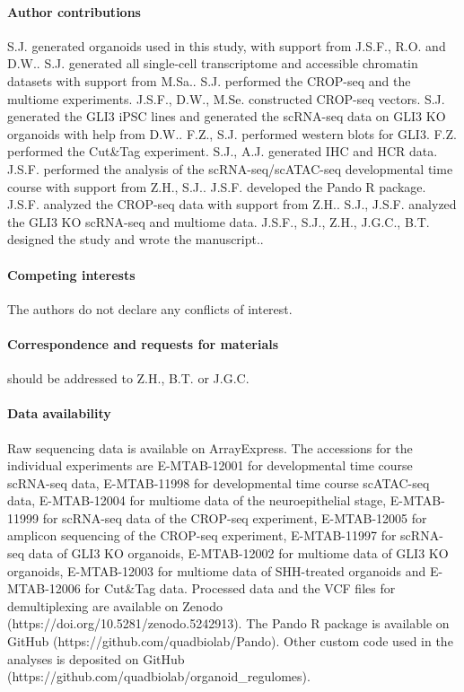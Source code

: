 \paragraph{Author contributions} S.J. generated organoids used in this study, with support from J.S.F., R.O. and D.W.. S.J. generated all single-cell transcriptome and accessible chromatin datasets with support from M.Sa.. S.J. performed the CROP-seq and the multiome experiments. J.S.F., D.W., M.Se. constructed CROP-seq vectors. S.J. generated the GLI3 iPSC lines and generated the scRNA-seq data on GLI3 KO organoids with help from D.W.. F.Z., S.J. performed western blots for GLI3. F.Z. performed the Cut\&Tag experiment. S.J., A.J. generated IHC and HCR data. J.S.F. performed the analysis of the scRNA-seq/scATAC-seq developmental time course with support from Z.H., S.J.. J.S.F. developed the Pando R package. J.S.F. analyzed the CROP-seq data with support from Z.H.. S.J., J.S.F. analyzed the GLI3 KO scRNA-seq and multiome data. J.S.F., S.J., Z.H., J.G.C., B.T. designed the study and wrote the manuscript..
 
\paragraph{Competing interests} The authors do not declare any conflicts of interest.

\paragraph{Correspondence and requests for materials} should be addressed to Z.H., B.T. or J.G.C.
 
\paragraph{Data availability} Raw sequencing data is available on ArrayExpress. The accessions for the individual experiments are E-MTAB-12001 for developmental time course scRNA-seq data, E-MTAB-11998 for developmental time course scATAC-seq data, E-MTAB-12004 for multiome data of the neuroepithelial stage, E-MTAB-11999 for scRNA-seq data of the CROP-seq experiment, E-MTAB-12005 for amplicon sequencing of the CROP-seq experiment, E-MTAB-11997 for scRNA-seq data of GLI3 KO organoids, E-MTAB-12002 for multiome data of GLI3 KO organoids, E-MTAB-12003 for multiome data of SHH-treated organoids and E-MTAB-12006 for Cut\&Tag data. Processed data and the VCF files for demultiplexing are available on Zenodo (https://doi.org/10.5281/zenodo.5242913). The Pando R package is available on GitHub (https://github.com/quadbiolab/Pando). Other custom code used in the analyses is deposited on GitHub (https://github.com/quadbiolab/organoid\_regulomes).
 
